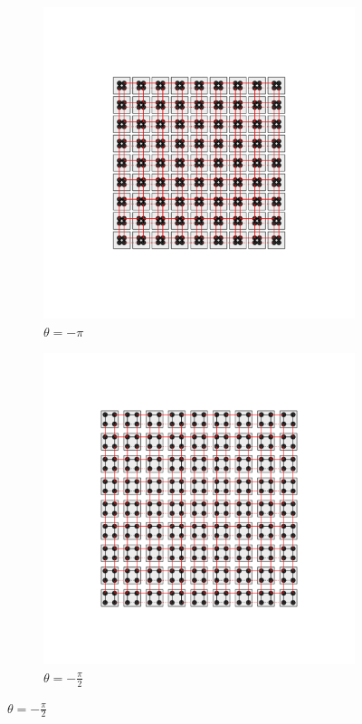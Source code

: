 
\begin{figure}[h!]
     \centering
    \captionsetup[sub]{font=small}
     \begin{minipage}[h!]{1\textwidth}
         \begin{subfigure}[b!]{0.2 \textwidth}
             \caption{$\theta = - \pi$}
             \includegraphics[width=\textwidth]{Imagenes/Models/Model_pump/square_pump_model_xy_0.pdf}
         \end{subfigure}\hspace*{-0.5em}
         \begin{subfigure}[b!]{0.2 \textwidth}
             \caption*{$\theta = -\frac{\pi}{2}$}
             \includegraphics[width=\textwidth]{Imagenes/Models/Model_pump/square_pump_model_xy_5.pdf}

\end{subfigure}
\end{minipage}
\end{figure}
